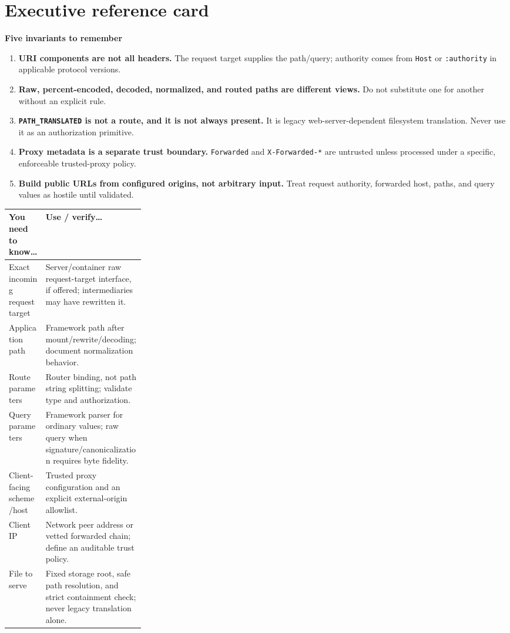 \documentclass[10pt,letterpaper,oneside]{article}
\newcommand{\code}[1]{\texttt{#1}}
\begin{document}
\section*{Executive reference card}
\begin{keybox}
\textbf{Five invariants to remember}
\begin{enumerate}
\item \textbf{URI components are not all headers.} The request target supplies the path/query; authority comes from \code{Host} or \code{:authority} in applicable protocol versions.
\item \textbf{Raw, percent-encoded, decoded, normalized, and routed paths are different views.} Do not substitute one for another without an explicit rule.
\item \textbf{\code{PATH\_TRANSLATED} is not a route, and it is not always present.} It is legacy web-server-dependent filesystem translation. Never use it as an authorization primitive.
\item \textbf{Proxy metadata is a separate trust boundary.} \code{Forwarded} and \code{X-Forwarded-*} are untrusted unless processed under a specific, enforceable trusted-proxy policy.
\item \textbf{Build public URLs from configured origins, not arbitrary input.} Treat request authority, forwarded host, paths, and query values as hostile until validated.
\end{enumerate}
\end{keybox}
\begin{table}[h!]
\centering\small
\begin{tabularx}{\linewidth}{P{0.27\linewidth}Y}
\toprule
\textbf{You need to know\ldots} & \textbf{Use / verify\ldots}\\\midrule
Exact incoming request target & Server/container raw request-target interface, if offered; intermediaries may have rewritten it.\\
Application path & Framework path after mount/rewrite/decoding; document normalization behavior.\\
Route parameters & Router binding, not path string splitting; validate type and authorization.\\
Query parameters & Framework parser for ordinary values; raw query when signature/canonicalization requires byte fidelity.\\
Client-facing scheme/host & Trusted proxy configuration and an explicit external-origin allowlist.\\
Client IP & Network peer address or vetted forwarded chain; define an auditable trust policy.\\
File to serve & Fixed storage root, safe path resolution, and strict containment check; never legacy translation alone.\\
\bottomrule
\end{tabularx}
\end{table}
\end{document}
